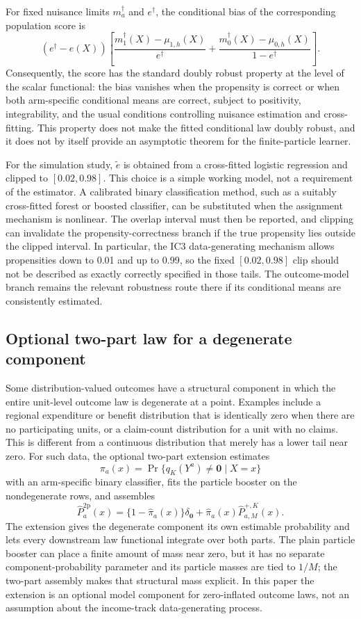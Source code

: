 For fixed nuisance limits $m_a^\dagger$ and $e^\dagger$, the conditional bias
of the corresponding population score is
\[
 (e^\dagger-e(X))\left[
 \frac{m_1^\dagger(X)-\mu_{1,h}(X)}{e^\dagger}
 +\frac{m_0^\dagger(X)-\mu_{0,h}(X)}{1-e^\dagger}
 \right].
\]
Consequently, the score has the standard doubly robust property at the level
of the scalar functional: the bias vanishes when the propensity is correct or
when both arm-specific conditional means are correct, subject to positivity,
integrability, and the usual conditions controlling nuisance estimation and
cross-fitting. This property does not make the fitted conditional law doubly
robust, and it does not by itself provide an asymptotic theorem for the
finite-particle learner.

For the simulation study, $\widetilde e$ is obtained from a cross-fitted
logistic regression and clipped to $[0.02,0.98]$. This choice is a simple
working model, not a requirement of the estimator. A calibrated binary
classification method, such as a suitably cross-fitted forest or boosted
classifier, can be substituted when the assignment mechanism is nonlinear.
The overlap interval must then be reported, and clipping can invalidate the
propensity-correctness branch if the true propensity lies outside the clipped
interval. In particular, the IC3 data-generating mechanism allows propensities
down to 0.01 and up to 0.99, so the fixed $[0.02,0.98]$ clip should not be
described as exactly correctly specified in those tails. The outcome-model
branch remains the relevant robustness route there if its conditional means
are consistently estimated.

\subsection{Optional two-part law for a degenerate component}\label{sec:zipt}

Some distribution-valued outcomes have a structural component in which the
entire unit-level outcome law is degenerate at a point. Examples include a
regional expenditure or benefit distribution that is identically zero when
there are no participating units, or a claim-count distribution for a unit
with no claims. This is different from a continuous distribution that merely
has a lower tail near zero. For such data, the optional two-part extension
estimates
\[
 \pi_a(x)=\Pr\{q_K(Y^a)\neq\mathbf{0}\mid X=x\}
\]
with an arm-specific binary classifier, fits the particle booster on the
nondegenerate rows, and assembles
\[
 \widehat P_a^{\mathrm{2p}}(x)=
 \{1-\widehat\pi_a(x)\}\delta_{\mathbf{0}}
 +\widehat\pi_a(x)\widehat P_{a,M}^{+,K}(x).
\]
The extension gives the degenerate component its own estimable probability
and lets every downstream law functional integrate over both parts. The plain
particle booster can place a finite amount of mass near zero, but it has no
separate component-probability parameter and its particle masses are tied to
$1/M$; the two-part assembly makes that structural mass explicit. In this
paper the extension is an optional model component for zero-inflated outcome
laws, not an assumption about the income-track data-generating process.
